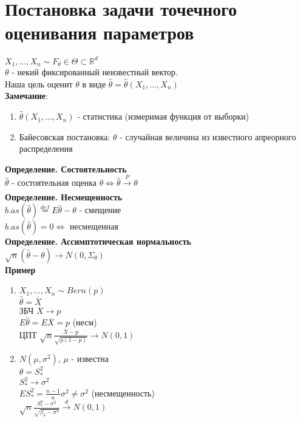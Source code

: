 \documentclass{article}
\newcommand\0{\mathbb{0}}
\newcommand\1{\mathbb{1}}
\begin{document}
\section{Постановка задачи точечного оценивания параметров}
$X_1, \dots, X_n \sim F_{\theta} \in \Theta \subset \mathbb{R}^d$\\
$\theta$ - некий фиксированный неизвестный вектор.\\
Наша цель оценит $\theta$ в виде $\widehat{\theta} = \widehat{\theta}(X_1, \dots, X_n)$\\
\textbf{Замечание}:
\begin{enumerate}
    \item $\widehat{\theta}(X_1, \dots, X_n)$ - статистика (измеримая функция от выборки)
    \item Байесовская постановка: $\theta$ - случайная величина из известного апреорного распределения
\end{enumerate}
\textbf{Определение. Состоятельность}\\
$\widehat{\theta}$ - состоятельная оценка $\theta \Leftrightarrow \widehat{\theta} \xrightarrow[]{P} \theta$\\
\textbf{Определение. Несмещенность}\\
$b.as(\widehat{\theta}) \stackrel{def}{=} E\widehat{\theta} - \theta$ - смещение\\
$b.as(\widehat{\theta}) = 0 \Leftrightarrow$ несмещенная\\
\textbf{Определение. Ассимптотическая нормальность}\\
$\sqrt{n}(\widehat{\theta} - \theta) \to N(0, \Sigma_{\theta})$\\
\textbf{Пример}
\begin{enumerate}
    \item $X_1, \dots, X_n \sim Bern(p)$\\
    $\widehat{\theta} = \overline{X}$\\
    ЗБЧ $\overline{X} \to p$\\
    $E\widehat{\theta} = E\overline{X} = p$ (несм)\\
    ЦПТ $\sqrt{n}\frac{\overline{X} - p}{\sqrt{p(1 - p)}} \to N(0, 1)$
    \item $N(\mu, \sigma^2)$, $\mu$ - известна\\
    $\theta = S_*^2$\\
    $S_*^2 \to \sigma^2$\\
    $ES_*^2 = \frac{n - 1}{n}\sigma^2 \neq \sigma^2$ (несмещенность)\\
    $\sqrt{n}\frac{S_*^2 - \sigma^2}{\sqrt{\beta_4 - \sigma^4}} \xrightarrow[]{d} N(0,1)$
\end{enumerate}
\end{document}
